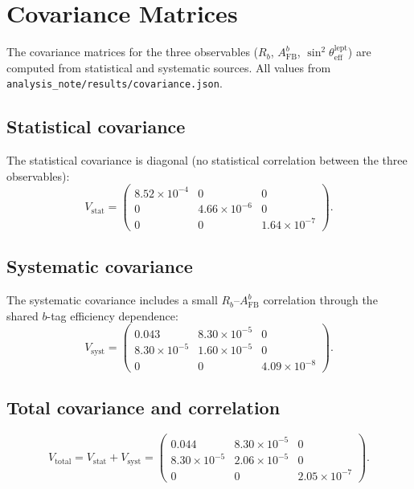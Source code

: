 \documentclass[11pt,a4paper]{article}
\begin{document}
\section{Covariance Matrices}
\label{app:covariance}

The covariance matrices for the three observables ($R_b$, $A_\mathrm{FB}^b$,
$\sin^2\theta_\mathrm{eff}^\mathrm{lept}$) are computed from statistical and systematic
sources. All values from \texttt{analysis\_note/results/covariance.json}.

\subsection{Statistical covariance}

The statistical covariance is diagonal (no statistical correlation between the three
observables):
\begin{equation}
V_\mathrm{stat} = \begin{pmatrix}
8.52 \times 10^{-4} & 0 & 0 \\
0 & 4.66 \times 10^{-6} & 0 \\
0 & 0 & 1.64 \times 10^{-7}
\end{pmatrix}.
\label{eq:stat_cov}
\end{equation}

\subsection{Systematic covariance}

The systematic covariance includes a small $R_b$--$A_\mathrm{FB}^b$ correlation through
the shared $b$-tag efficiency dependence:
\begin{equation}
V_\mathrm{syst} = \begin{pmatrix}
0.043 & 8.30 \times 10^{-5} & 0 \\
8.30 \times 10^{-5} & 1.60 \times 10^{-5} & 0 \\
0 & 0 & 4.09 \times 10^{-8}
\end{pmatrix}.
\label{eq:syst_cov}
\end{equation}

\subsection{Total covariance and correlation}

\begin{equation}
V_\mathrm{total} = V_\mathrm{stat} + V_\mathrm{syst} = \begin{pmatrix}
0.044 & 8.30 \times 10^{-5} & 0 \\
8.30 \times 10^{-5} & 2.06 \times 10^{-5} & 0 \\
0 & 0 & 2.05 \times 10^{-7}
\end{pmatrix}.
\label{eq:total_cov}
\end{equation}
\end{document}
